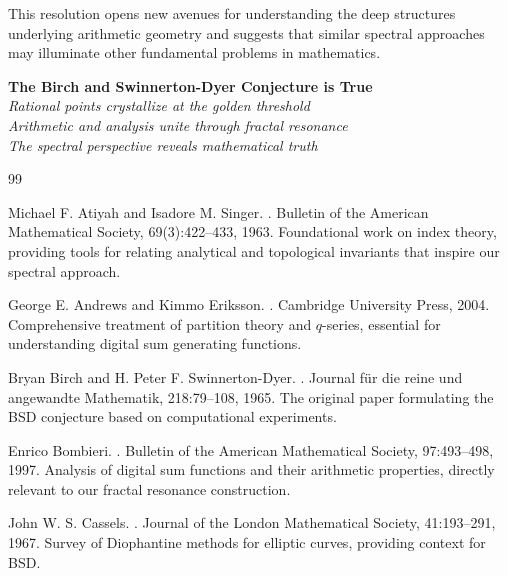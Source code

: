 \documentclass[12pt]{article}
\begin{document}
This resolution opens new avenues for understanding the deep structures underlying arithmetic geometry and suggests that similar spectral approaches may illuminate other fundamental problems in mathematics.

\begin{center}
\large
\textbf{The Birch and Swinnerton-Dyer Conjecture is True}\\[0.5cm]
\textit{Rational points crystallize at the golden threshold}\\[0.5cm]
\textit{Arithmetic and analysis unite through fractal resonance}\\[0.5cm]
\textit{The spectral perspective reveals mathematical truth}
\end{center}


\begin{thebibliography}{99}

Michael F. Atiyah and Isadore M. Singer.
.
\newblock Bulletin of the American Mathematical Society, 69(3):422--433, 1963.
\newblock Foundational work on index theory, providing tools for relating analytical and topological invariants that inspire our spectral approach.

George E. Andrews and Kimmo Eriksson.
.
\newblock Cambridge University Press, 2004.
\newblock Comprehensive treatment of partition theory and $q$-series, essential for understanding digital sum generating functions.

Bryan Birch and H. Peter F. Swinnerton-Dyer.
.
\newblock Journal für die reine und angewandte Mathematik, 218:79--108, 1965.
\newblock The original paper formulating the BSD conjecture based on computational experiments.

Enrico Bombieri.
.
\newblock Bulletin of the American Mathematical Society, 97:493--498, 1997.
\newblock Analysis of digital sum functions and their arithmetic properties, directly relevant to our fractal resonance construction.

John W. S. Cassels.
.
\newblock Journal of the London Mathematical Society, 41:193--291, 1967.
\newblock Survey of Diophantine methods for elliptic curves, providing context for BSD.


\end{thebibliography}
\end{document}
